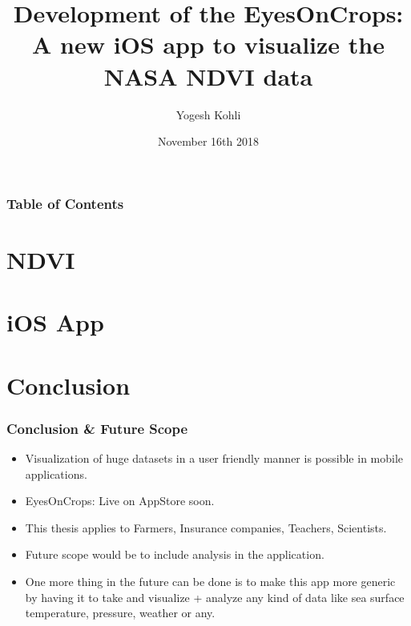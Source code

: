 \documentclass[hyperref={bookmarks=false},aspectratio=169]{beamer}
\title[NASA NDVI data visualization and delivery]
{\bfseries{Development of the EyesOnCrops: A new iOS app to visualize the NASA NDVI data}}
\author{Yogesh Kohli}
\institute{San Diego State University}
\date{November 16th 2018}
\begin{document}
\titlepage  %

\begin{frame}
\frametitle{Table of Contents}
\tableofcontents
\end{frame}



\section{NDVI}


\section{iOS App}


\section{Conclusion}

\begin{frame}
\frametitle{Conclusion \& Future Scope}
\begin{itemize}
    \item Visualization of huge datasets in a user friendly manner is possible in mobile applications.
    \item EyesOnCrops: Live on AppStore soon.
    \item This thesis applies to Farmers, Insurance companies, Teachers, Scientists.
    \item Future scope would be to include analysis in the application.
    \item One more thing in the future can be done is to make this app more generic by having it to take and visualize + analyze any kind of data like sea surface temperature, pressure, weather or any.
\end{itemize}
\end{frame}
\end{document}
